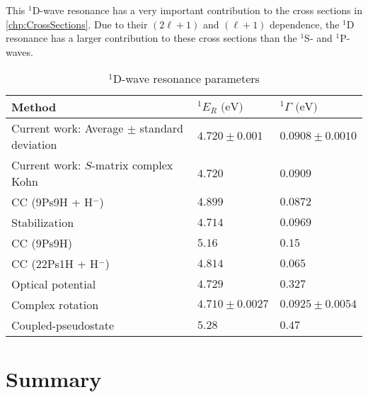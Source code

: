 \documentclass[Dissertation.tex]{subfiles}
\begin{document}
This $^1$D-wave resonance has a very important contribution to the cross
sections in \cref{chp:CrossSections}. Due to their $(2\ell+1)$ and $(\ell+1)$
dependence, the $^1$D resonance has a larger contribution to these cross
sections than the $^1$S- and $^1$P-waves.



\setlength{\abovecaptionskip}{6pt}   %
\setlength{\belowcaptionskip}{6pt}   %
\begin{table}
\centering
\begin{tabular}{l l l}
\toprule
Method & $^1E_R \text{ (eV)}$ & $^1\Gamma \text{ (eV)}$ \\
\midrule
Current work: Average $\pm$ standard deviation & $4.720 \pm 0.001$ & $0.0908 \pm 0.0010$ \\
Current work: $S$-matrix complex Kohn & $4.720$ & $0.0909$ \\
CC (9Ps9H + H$^-$) \cite{Walters2004} & $4.899$ & $0.0872$ \\
Stabilization \cite{Yan2003} & $4.714$ & $0.0969$ \\
CC (9Ps9H) \cite{Blackwood2002} & $5.16$ & $0.15$ \\
CC (22Ps1H + H$^-$) \cite{Blackwood2002b} & $4.814$ & $0.065$ \\
Optical potential \cite{DiRienzi2002a} & $4.729$ & $0.327$ \\
Complex rotation \cite{Ho1998} & $4.710 \pm 0.0027$ & $0.0925 \pm 0.0054$  \\
Coupled-pseudostate \cite{Campbell1998} & $5.28$ & $0.47$ \\
\bottomrule
\end{tabular}
\caption{$^1$D-wave resonance parameters}
\label{tab:DWaveResonancesOther}
\end{table}


\section{Summary}
\label{sec:SummaryD}




\biblio
\end{document}
